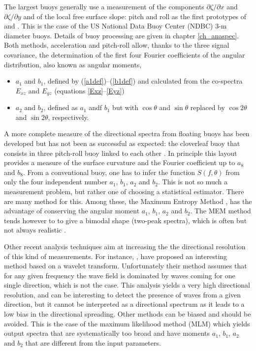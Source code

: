 The largest buoys generally use a measurement of the components $\partial \zeta /\partial x$ and $\partial \zeta/ \partial y$ and of the local free 
surface slope: pitch and roll as the first prototypes of \cite{Longuet-Higgins&al.1963} and \cite{Cartwright&Smith1964}. This is the case of the US 
National Data Buoy Center (NDBC) 3-m diameter buoys.
Details of buoy processing are given in chapter \ref{ch_anaspec}. Both methods, acceleration and pitch-roll allow, thanks to the three signal covariance, 
the determination of the first four Fourier coefficients 
of the angular distribution, also known as angular moments,
\begin{itemize}
  \item  $a_1$ and $b_1$, defined by (\ref{a1def})--(\ref{b1def}) and calculated from the co-spectra $E_{xz}$ and $E_{yz}$ (equations \ref{Exz}--\ref{Eyz})
\item $a_2$ and $b_2$, defined as $a_1$ andf $b_1$ but with $\cos \theta$ and $\sin \theta$ replaced by $\cos 2 \theta$ and $\sin 2 \theta$, respectively.
\end{itemize}

A more complete measure of the directional spectra from floating buoys has been developed but has not been as successful as expected: the cloverleaf buoy that consists in three 
pitch-roll buoy linked to each other \citep{Mitsuyasu&al.1975}. In principle this layout provides a measure of the surface curvature and the Fourier coefficient up to $a_8$ and $b_8$.
From a conventional buoy, one has to infer the function $S(f,\theta)$ from only the four independent number $a_1$, $b_1$, $a_2$ and $b_2$. This is not so much a 
measurement problem, but rather one of choosing a statistical estimator. There are many method for this. Among these, the Maximum Entropy Method \citep[MEM][]{Lygre&Krogstad1986}, 
has the advantage of conserving the angular moment  $a_1$, $b_1$, $a_2$ and $b_2$. The MEM method tends however to 
to give a bimodal shape (two-peak spectra), which is often \citep{Ewans1998} but not always realistic \citep{Benoit&al.1997}.

Other recent analysis techniques aim at increasing the the directional resolution of this kind of measurements. For instance, \cite{Donelan&al.1996}, 
have proposed an interesting method based on a wavelet transform. Unfortunately their method assumes that for any given frequency 
the wave field is dominated by waves coming for one single direction, which is not the case. This analysis yields a very high directional resolution, and can be interesting 
to detect the presence of waves from a given direction, but it cannot be interpreted as a directional spectrum as it leads to a low bias in the directional spreading. Other methods can be biased and 
should be avoided. This is 
the case of the maximum likelihood method (MLM) which yields output spectra that are systematically too broad and have moments $a_1$, $b_1$, $a_2$ and $b_2$ that 
are different from the input parameters.
 
